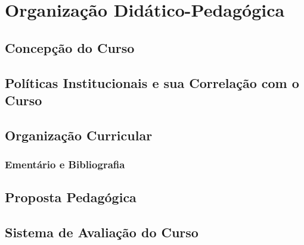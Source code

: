 \newpage
\section{Organiza\c{c}\~ao Did\'atico-Pedag\'ogica}

\subsection{Concep\c{c}\~ao do Curso}


\subsection{Pol\'iticas Institucionais e sua Correla\c{c}\~ao com o Curso}


\subsection{Organiza\c{c}\~ao Curricular}


\subsubsection{Ement\'ario e Bibliografia}


\newpage

\subsection{Proposta Pedag\'ogica}


\subsection{Sistema de Avalia\c{c}\~ao do Curso}



